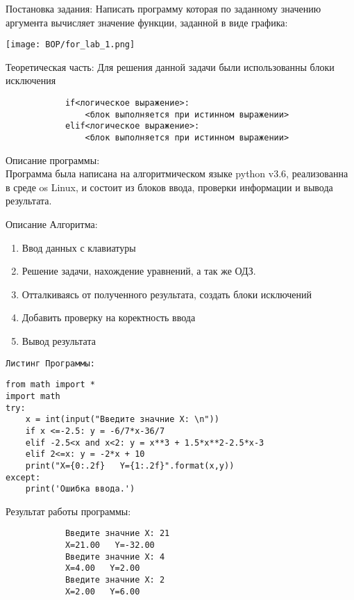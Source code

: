 \documentclass[a4paper]{article}
\begin{document}
    \begin{lab1}
       Постановка задания: Написать программу которая по заданному значению аргумента вычисляет значение функции, заданной в виде графика:
        \begin{center}
            \texttt{[image: BOP/for\_lab\_1.png]}
        \end{center}
    \begin{theory}
        Теоретическая часть:
        Для решения данной задачи были использованны блоки исключения
        \begin{verbatim}
            if<логическое выражение>:
                <блок выполняется при истинном выражении>
            elif<логическое выражение>:
                <блок выполняется при истинном выражении>
        \end{verbatim}
    \end{theory}
    \begin{description}
        Описание программы:\\
        Программа была написана на алгоритмическом языке python v3.6, реализованна в среде os Linux, и состоит из блоков ввода, проверки информации и вывода результата.
    \end{description}
    \begin{algoritm}
        Описание Алгоритма:
        \small\begin{enumerate}
            \item Ввод данных с клавиатуры
            \item Решение задачи, нахождение уравнений, а так же ОДЗ.
            \item Отталкиваясь от полученного результата, создать блоки исключений
            \item Добавить проверку на коректность ввода
            \item Вывод результата
        \end{enumerate}
    \end{algoritm}
        \texttt{Листинг Программы:}
    \begin{verbatim}
from math import *
import math
try:
    x = int(input("Введите значние X: \n"))
    if x <=-2.5: y = -6/7*x-36/7
    elif -2.5<x and x<2: y = x**3 + 1.5*x**2-2.5*x-3
    elif 2<=x: y = -2*x + 10
    print("X={0:.2f}   Y={1:.2f}".format(x,y))
except:
    print('Ошибка ввода.')
    \end{verbatim}
    \begin{center}
    Результат работы программы:
        \begin{verbatim}
            Введите значние X: 21
            X=21.00   Y=-32.00
            Введите значние X: 4
            X=4.00   Y=2.00
            Введите значние X: 2
            X=2.00   Y=6.00
        \end{verbatim}
    \end{center}
    \end{lab1}
\end{document}
